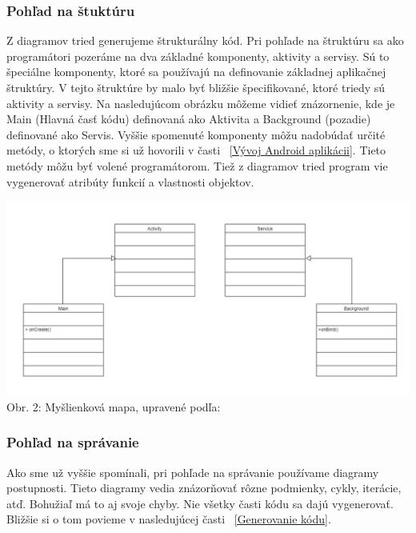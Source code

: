 \documentclass[10pt,twoside,slovak,a4paper]{article}
\begin{document}
\subsubsection{Pohľad na štuktúru}\label{MDE spôsob pre Android:Modelovanie:Pohľad na štuktúru}
Z diagramov tried generujeme štrukturálny kód. Pri pohľade na štruktúru sa ako programátori pozeráme na dva základné komponenty,  aktivity a servisy. Sú to špeciálne komponenty, ktoré sa používajú na definovanie základnej aplikačnej štruktúry. V tejto štruktúre by malo byť bližšie špecifikované, ktoré triedy sú aktivity a servisy. Na nasledujúcom obrázku môžeme vidieť znázornenie, kde je Main (Hlavná časť kódu) definovaná ako Aktivita a Background (pozadie) definované ako Servis. \newline
Vyššie spomenuté komponenty môžu nadobúdať určité metódy, o ktorých sme si už hovorili v časti ~\ref{Vývoj Android aplikácii}. Tieto metódy môžu byť volené programátorom.\newline
Tiež z diagramov tried program vie vygenerovať atribúty funkcií a vlastnosti objektov.\cite{GenerovanieAndroid}\cite{GenerovanieJava}
\begin{center}
\includegraphics[scale=0.5]{diagram.png}
Obr. 2: Myšlienková mapa, upravené podľa:\cite{GenerovanieAndroid}
\end{center}

\subsubsection{Pohľad na správanie}\label{MDE spôsob pre Android:Modelovanie:Pohľad na správanie}
Ako sme už vyššie spomínali, pri pohľade na správanie používame diagramy postupnosti. Tieto diagramy vedia znázorňovať rôzne podmienky, cykly, iterácie, atď. Bohužiaľ má to aj svoje chyby. Nie všetky časti kódu sa dajú vygenerovať. Bližšie si o tom povieme v nasledujúcej časti ~\ref{Generovanie kódu}.\cite{GenerovanieAndroid} \cite{GenerovanieJava}
\end{document}
